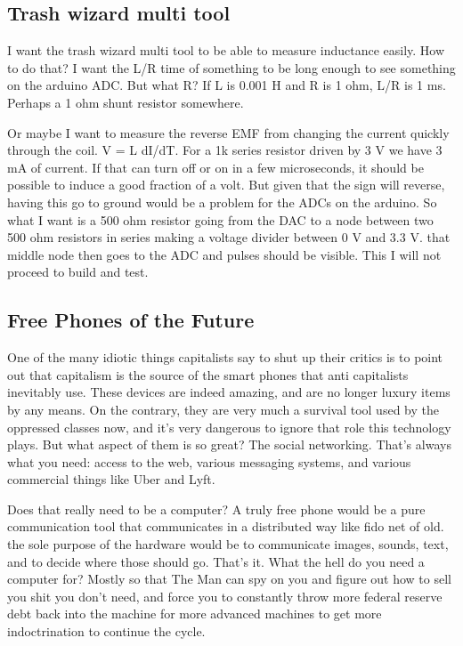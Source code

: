 \subsection{Trash wizard multi tool}\label{trash-wizard-multi-tool}

I want the trash wizard multi tool to be able to measure inductance
easily. How to do that? I want the L/R time of something to be long
enough to see something on the arduino ADC. But what R? If L is 0.001 H
and R is 1 ohm, L/R is 1 ms. Perhaps a 1 ohm shunt resistor somewhere.

Or maybe I want to measure the reverse EMF from changing the current
quickly through the coil. V = L dI/dT. For a 1k series resistor driven
by 3 V we have 3 mA of current. If that can turn off or on in a few
microseconds, it should be possible to induce a good fraction of a volt.
But given that the sign will reverse, having this go to ground would be
a problem for the ADCs on the arduino. So what I want is a 500 ohm
resistor going from the DAC to a node between two 500 ohm resistors in
series making a voltage divider between 0 V and 3.3 V. that middle node
then goes to the ADC and pulses should be visible. This I will not
proceed to build and test.

\subsection{Free Phones of the Future}\label{free-phones-of-the-future}

One of the many idiotic things capitalists say to shut up their critics
is to point out that capitalism is the source of the smart phones that
anti capitalists inevitably use. These devices are indeed amazing, and
are no longer luxury items by any means. On the contrary, they are very
much a survival tool used by the oppressed classes now, and it's very
dangerous to ignore that role this technology plays. But what aspect of
them is so great? The social networking. That's always what you need:
access to the web, various messaging systems, and various commercial
things like Uber and Lyft.

Does that really need to be a computer? A truly free phone would be a
pure communication tool that communicates in a distributed way like fido
net of old. the sole purpose of the hardware would be to communicate
images, sounds, text, and to decide where those should go. That's it.
What the hell do you need a computer for? Mostly so that The Man can spy
on you and figure out how to sell you shit you don't need, and force you
to constantly throw more federal reserve debt back into the machine for
more advanced machines to get more indoctrination to continue the cycle.

